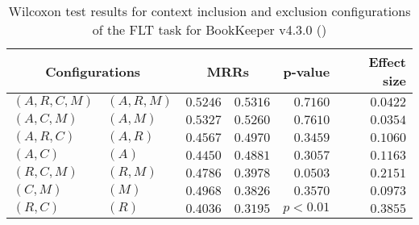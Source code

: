 
\begin{table}
\begin{spacing}{1.2}
\centering
\caption{Wilcoxon test results for context inclusion and exclusion configurations of the FLT task for BookKeeper v4.3.0 (\ctwo)}
\label{table:versus-wilcox-bookkeeper-flt-context}
\begin{tabular}{ll|rr|rr}
\toprule
      \multicolumn{2}{c|}{Configurations} &                \multicolumn{2}{c|}{MRRs} &             p-value & Effect size \\
\midrule
 $(A,R,C,M)$ &  $(A,R,M)$ &       $0.5246$ &  $\bm{0.5316}$ & $0.7160$ &    $0.0422$ \\
   $(A,C,M)$ &    $(A,M)$ &  $\bm{0.5327}$ &       $0.5260$ & $0.7610$ &    $0.0354$ \\
   $(A,R,C)$ &    $(A,R)$ &       $0.4567$ &  $\bm{0.4970}$ & $0.3459$ &    $0.1060$ \\
     $(A,C)$ &      $(A)$ &       $0.4450$ &  $\bm{0.4881}$ & $0.3057$ &    $0.1163$ \\
   $(R,C,M)$ &    $(R,M)$ &  $\bm{0.4786}$ &       $0.3978$ & $0.0503$ &    $0.2151$ \\
     $(C,M)$ &      $(M)$ &  $\bm{0.4968}$ &       $0.3826$ & $0.3570$ &    $0.0973$ \\
     $(R,C)$ &      $(R)$ &  $\bm{0.4036}$ &       $0.3195$ & $p<0.01$ &    $0.3855$ \\
\bottomrule
\end{tabular}

\end{spacing}
\end{table}

